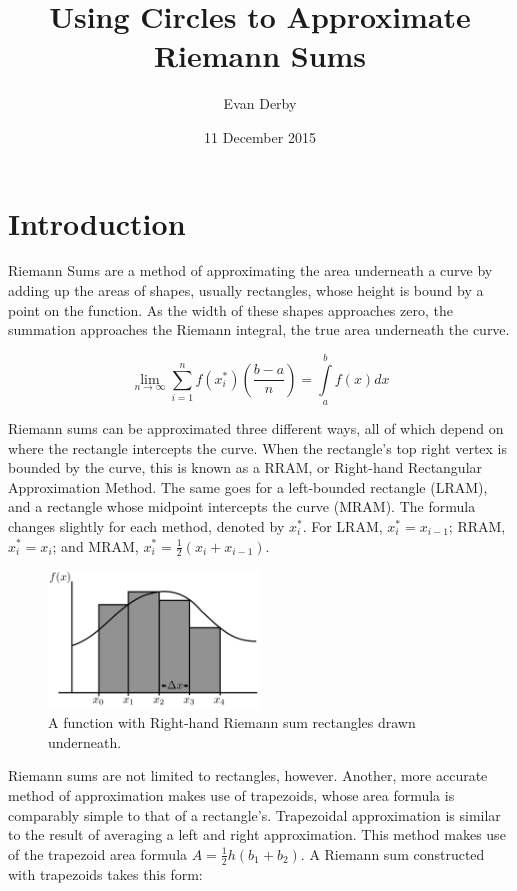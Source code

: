 \documentclass{article}
\begin{document}
  \title{Using Circles to Approximate Riemann Sums}
  \author{Evan Derby}
  \date{11 December 2015}
  \maketitle

  \section{Introduction}
    Riemann Sums are a method of approximating the area underneath a curve by
    adding up the areas of shapes, usually rectangles, whose height is bound by
    a point on the function. As the width of these shapes approaches zero, the
    summation approaches the Riemann integral, the true area underneath the
    curve.

    \[ \displaystyle\lim_{n \to \infty}\sum_{i=1}^{n} f(x^*_i) \left(\frac{b-a}{n}\right) = \int\limits_a^b f(x)dx \]

    Riemann sums can be approximated three different ways, all of which depend on
    where the rectangle intercepts the curve. When the rectangle's top right
    vertex is bounded by the curve, this is known as a RRAM, or Right-hand
    Rectangular Approximation Method. The same goes for a left-bounded rectangle
     (LRAM), and a rectangle whose midpoint intercepts the curve (MRAM). The
    formula changes slightly for each method, denoted by \( x^*_i \). For LRAM,
    \( x_i^* = x_{i-1} \); RRAM, \( x_i^* = x_i \); and MRAM, \( x_i^* = \frac{1}{2}(x_i + x_{i-1}) \).

    \begin{figure}[h]
      \centering
      \includegraphics[width=0.5\textwidth]{riemann_1}
      \caption{A function with Right-hand Riemann sum rectangles drawn underneath.}
    \end{figure}

    Riemann sums are not limited to rectangles, however. Another, more accurate method of
    approximation makes use of trapezoids, whose area formula is comparably
    simple to that of a rectangle's. Trapezoidal approximation is similar to
    the result of averaging a left and right approximation. This method makes
    use of the trapezoid area formula \( A = \frac{1}{2}h(b_1+b_2) \). A Riemann
    sum constructed with trapezoids takes this form:
\end{document}
